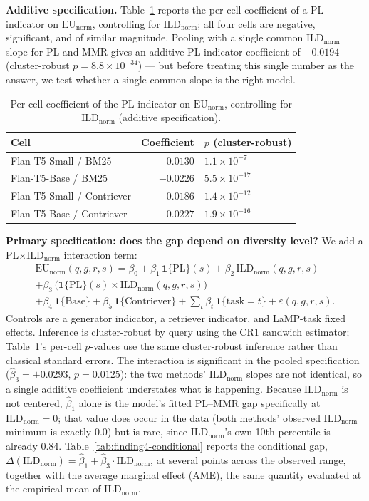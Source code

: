 \documentclass[11pt]{article}
\newcommand{\eunorm}{\ensuremath{\mathrm{EU}_{\mathrm{norm}}}}
\newcommand{\ild}{\ensuremath{\mathrm{ILD}}}
\newcommand{\ildnorm}{\ensuremath{\ild_{\mathrm{norm}}}}
\newcommand{\isPL}{\ensuremath{\mathbf{1}\{\mathrm{PL}\}}}
\begin{document}
\textbf{Additive specification.} Table~\ref{tab:finding4-additive}
reports the per-cell coefficient of a PL indicator on \eunorm{},
controlling for \ildnorm{}; all four cells are negative, significant, and
of similar magnitude. Pooling with a single common \ildnorm{} slope for PL
and MMR gives an additive PL-indicator coefficient of $-0.0194$
(cluster-robust $p=8.8\times10^{-34}$) --- but before treating this single
number as the answer, we test whether a single common slope is the right
model.

\begin{table}[htbp]
\centering
\caption{Per-cell coefficient of the PL indicator on \eunorm{}, controlling
for \ildnorm{} (additive specification).}
\label{tab:finding4-additive}
\begin{tabular}{lrl}
\toprule
Cell & Coefficient & $p$ (cluster-robust) \\
\midrule
Flan-T5-Small / BM25 & $-0.0130$ & $1.1\times10^{-7}$ \\
Flan-T5-Base / BM25 & $-0.0226$ & $5.5\times10^{-17}$ \\
Flan-T5-Small / Contriever & $-0.0186$ & $1.4\times10^{-12}$ \\
Flan-T5-Base / Contriever & $-0.0227$ & $1.9\times10^{-16}$ \\
\bottomrule
\end{tabular}
\end{table}

\textbf{Primary specification: does the gap depend on diversity level?}
We add a PL$\times$\ildnorm{} interaction term:
\begin{multline}
\eunorm(q,g,r,s) = \beta_0 + \beta_1\,\isPL(s) + \beta_2\,\ildnorm(q,g,r,s) \\
+ \beta_3\,\big(\isPL(s)\times\ildnorm(q,g,r,s)\big) \\
+ \beta_4\,\mathbf{1}\{\text{Base}\} + \beta_5\,\mathbf{1}\{\text{Contriever}\}
+ \textstyle\sum_t \beta_t\,\mathbf{1}\{\text{task}=t\} + \varepsilon(q,g,r,s).
\label{eq:finding4-interaction}
\end{multline}
Controls are a generator indicator, a retriever indicator, and LaMP-task
fixed effects. Inference is cluster-robust by query using the CR1
sandwich estimator; Table~\ref{tab:finding4-additive}'s per-cell
$p$-values use the same cluster-robust inference rather than classical
standard errors. The interaction
is significant in the pooled specification
($\hat\beta_3=+0.0293$, $p=0.0125$): the two methods' \ildnorm{} slopes
are not identical, so a single additive coefficient understates what is
happening. Because \ildnorm{} is not centered, $\hat\beta_1$ alone is the
model's fitted PL--MMR gap specifically at $\ildnorm=0$; that value does
occur in the data (both methods' observed \ildnorm{} minimum is exactly
0.0) but is rare, since \ildnorm{}'s own 10th percentile is already 0.84.
Table~\ref{tab:finding4-conditional} reports the conditional gap,
$\Delta(\ildnorm)=\hat\beta_1+\hat\beta_3\cdot\ildnorm$, at several points
across the observed range, together with the average marginal effect
(AME), the same quantity evaluated at the empirical mean of \ildnorm{}.
\end{document}
